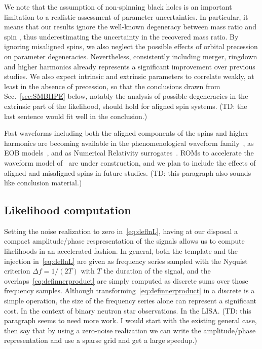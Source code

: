 \documentclass[aps,showpacs,twocolumn,prd,superscriptaddress,nofootinbib]{revtex4-1}
\newcommand{\tdc}[1]{{\color{red} (TD: #1)}}
\begin{document}
We note that the assumption of non-spinning black holes is an important limitation to a realistic assessment of parameter uncertainties. In particular, it means that our results ignore the well-known degeneracy between mass ratio and spin \cite{Baird+2013}, thus underestimating the uncertainty in the recovered mass ratio. By ignoring misaligned spins, we also neglect the possible effects of orbital precession on parameter degeneracies. Nevertheless, consistently including merger, ringdown and higher harmonics already represents a significant improvement over previous studies. We also expect intrinsic and extrinsic parameters to correlate weakly, at least in the absence of precession, so that the conclusions drawn from Sec.~\ref{sec:SMBHPE} below, notably the analysis of possible degeneracies in the extrinsic part of the likelihood, should hold for aligned spin systems. \tdc{the last sentence would fit well in the conclusion.}

Fast waveforms including both the aligned components of the spins and higher harmonics are becoming available in the phenomenological waveform family~\cite{London+17}, as EOB models~\cite{Cotesta+18}, and as Numerical Relativity surrogates~\cite{Varma+18}.
ROMs to accelerate the waveform model of~\cite{Cotesta+18} are under construction, and we plan to include the effects of aligned and misaligned spins in future studies.
\tdc{this paragraph also sounds like conclusion material.}


\subsection{Likelihood computation}
\label{sec:likelihood}

Setting the noise realization to zero in~\eqref{eq:deflnL}, having at our disposal a compact amplitude/phase respresentation of the signals allows us to compute likelihoods in an accelerated fashion. In general, both the template and the injection in~\eqref{eq:deflnL} are given as frequency series sampled with the Nyquist criterion $\Delta f = 1/(2T)$ with $T$ the duration of the signal, and the overlaps~\eqref{eq:definnerproduct} are simply computed as discrete sums over those frequency samples. Although transforming~\eqref{eq:definnerproduct} in a discrete is a simple operation, the size of the frequency series alone can represent a significant cost. In the context of binary neutron star observations. In the LISA. \tdc{this paragraph seems to need more work. I would start with the existing general case, then say that by using a zero-noise realization we can write the amplitude/phase representation and use a sparse grid and get a large speedup.}
\end{document}
